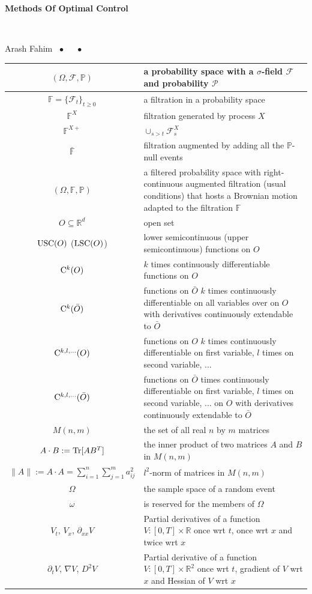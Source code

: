 \documentclass[11pt]{book}
\newcommand{\thiscoursecode}{Methods Of Optimal Control}
\newcommand{\thiscoursename}{}
\newcommand{\thisprof}{Arash Fahim}
\newcommand{\thisterm}{}
\newcommand{\website}{}
\newcommand{\notefront} {
\pagenumbering{roman}
\begin{center}

{\ttfamily \url{\website}} {\small}

{\Huge\bfseries \thiscoursecode\par}%

{\large{\noun{\thiscoursename}}}\\ \vspace{0.1in}

  {\noun \thisprof} \ $\bullet$ \ {\noun \thisterm} \ $\bullet$ \ {\noun {}} \\

  \end{center}
  }
\begin{document}
  \notefront
  \tocandfigures
  
    \begin{center}
 \medskip
 
 \begin{tabularx}{.9\textwidth}{|c|X|}
  \hline
$(\Omega,\mathcal{F},\mathbb{P})$ & a probability space with a $\sigma$-field $\mathcal{F}$ and probability $\mathcal{P}$\\
 \hline
 $\mathbb{F}=\{\mathcal{F}_t\}_{t\ge0}$ & a filtration in a probability space\\
 \hline
 
$\mathbb{F}^{X}$ & filtration generated by process $X$\\
 \hline
 $\mathbb{F}^{X+}$ & $\cup_{s>t}\mathcal{F}^X_s$\\
 \hline
 $\bar{\mathbb{F}}$ & filtration augmented by adding all the $\mathbb{P}$-null events\\
 \hline
 $(\Omega,\mathbb{F},\mathbb{P})$& a filtered probability space with right-continuous augmented filtration (usual conditions) that hosts a Brownian motion adapted to the filtration $\mathbb{F}$\\
 \hline
 $O\subseteq\mathbb{R}^d$& open set\\
  \hline
 ${\rm USC}(O)$ (${\rm LSC}(O)$) &  lower semicontinuous (upper semicontinuous) functions on  $O$\\
  \hline
 ${\rm C}^{k}(O)$ &  $k$ times continuously differentiable functions on $O$  \\
  \hline
  ${\rm C}^{k}(\bar O)$ & functions on $\bar O$  $k$ times continuously differentiable  on all variables over on  $O$ with derivatives continuously extendable to $\bar O$\\
   \hline
 ${\rm C}^{k,l,...}(O)$ & functions on $O$ $k$ times continuously differentiable on first variable, $l$ times on second variable, ... \\
  \hline
 ${\rm C}^{k,l,...}(\bar O)$ & functions on $\bar O$ times continuously differentiable on first variable, $l$ times on second variable, ... on $O$ with derivatives continuously extendable to $\bar O$ \\
  \hline
 $M(n,m)$&the set of all real $n$ by $m$ matrices\\
  \hline
 $A\cdot B:={\rm Tr}[AB^T]$& the inner product of two matrices $A$ and $B$ in $M(n,m)$\\
  \hline
 $\|A\|:=A\cdot A=\sum_{i=1}^n\sum_{j=1}^ma_{ij}^2$& $l^2$-norm of matrices in $M(n,m)$\\
  \hline
 $\Omega$ & the sample space of a random event\\
  \hline
 $\omega$& is reserved for the members of $\Omega$\\
  \hline
 ${V}_{t}$, $ V_{x}$, $\partial_{xx} V$& Partial derivatives of a function $V:[0,T]\times\mathbb{R}$ once wrt $t$, once wrt $x$ and twice wrt $x$\\
  \hline
 $\partial_tV$, $\nabla V$, $D^2 V$& Partial derivative of a function $V:[0,T]\times\mathbb{R}^2$ once wrt $t$, gradient of $V$ wrt $x$ and Hessian of $V$ wrt $x$\\
  \hline
 \end{tabularx}
\end{center}
\end{document}
